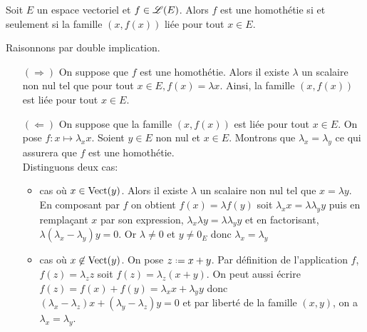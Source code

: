 \begin{prop}
    Soit $E$ un espace vectoriel et $f \in \mathscr{L}(E)$. Alors $f$ est une homothétie si et seulement si la famille $(x, f(x))$ liée pour tout $x \in E$.
\end{prop}

\begin{marginfigure}
    \centering
    
\end{marginfigure}

\begin{preuve}
    Raisonnons par double implication. 
    \begin{itemize}
        \item[$(\Rightarrow)$] On suppose que $f$ est une homothétie. Alors il existe $\lambda$ un scalaire non nul tel que pour tout $x \in E, f(x) = \lambda x$. Ainsi, la famille $(x, f(x))$ est liée pour tout $x \in E$. 
        \item[$(\Leftarrow)$]  On suppose que la famille $(x, f(x))$ est liée pour tout $x \in E$. On pose $f:x \mapsto \lambda_x x$. Soient $y \in E$ non nul et $x \in E$. Montrons que $\lambda_x = \lambda_{y}$ ce qui assurera que $f$ est une homothétie. \\
        Distinguons deux cas:
        \begin{itemize}
            \item cas où $x \in \mathrm{Vect}(y)$. Alors il existe $\lambda$ un scalaire non nul tel que $x = \lambda y$. En composant par $f$ on obtient $f(x) = \lambda f(y)$ soit $\lambda_x x = \lambda \lambda_{y} y$ puis en remplaçant $x$ par son expression, $\lambda_x \lambda y = \lambda \lambda_{y} y$ et en factorisant, $\lambda (\lambda_x - \lambda_{y}) y = 0$. Or $\lambda \not= 0$ et $y \not= 0_E$ donc $\lambda_x = \lambda_{y}$
            \item cas où $x \not \in \mathrm{Vect}(y)$. On pose $z \defeq x + y$. Par définition de l'application $f$, $f(z) = \lambda_z z$ soit $f(z) = \lambda_z(x + y)$. On peut aussi écrire $f(z) = f(x) + f(y) = \lambda_x x + \lambda_y y$ donc $(\lambda_x - \lambda_z) x + (\lambda_{y} - \lambda_z) y = 0$ et par liberté de la famille $(x, y)$, on a $\lambda_x = \lambda_{y}$.
        \end{itemize}
    \end{itemize}
\end{preuve}
